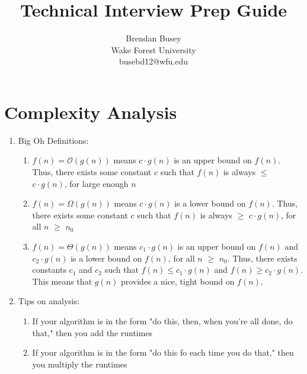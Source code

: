 \documentclass [12pt, executivepaper]{article}
\begin{document}
\title {Technical Interview Prep Guide}
\author{Brendan Busey\\Wake Forest University\\ busebd12@wfu.edu}
\maketitle

\pagebreak

\vspace*{-40mm}

\section*{Complexity Analysis}

\begin{enumerate}

\item Big Oh Definitions:

\begin{enumerate}

\item $f(n)=\mathcal{O}(g(n))$ means $c \cdot g(n)$ is an upper bound on $f(n)$. Thus, there exists some constant $c$ such that $f(n)$ is always $\leq$ $c \cdot g(n)$, for large enough $n$

\item $f(n)=\Omega(g(n))$ means $c \cdot g(n)$ is a lower bound on $f(n)$. Thus, there exists some constant $c$ such that $f(n)$ is always $\geq$ $c \cdot g(n)$, for all $n$ $\geq$ $n_{0}$

\item $f(n)=\Theta(g(n))$ means $c_{1} \cdot g(n)$ is an upper bound on $f(n)$ and $c_{2} \cdot g(n)$ is a lower bound on $f(n)$, for all $n$ $\geq$ $n_{0}$. Thus, there exists constants $c_{1}$ and $c_{2}$ such that
$f(n) \leq c_{1} \cdot g(n)$ and $f(n) \geq c_{2} \cdot g(n)$. This means that $g(n)$ provides a nice, tight bound on $f(n)$.

\end{enumerate}

\item Tips on analysis:

\begin{enumerate}

\item If your algorithm is in the form "do this, then, when you're all done, do that," then you add the runtimes

\item If your algorithm is in the form "do this fo each time you do that," then you multiply the runtimes


\end{enumerate}
\end{enumerate}
\end{document}
